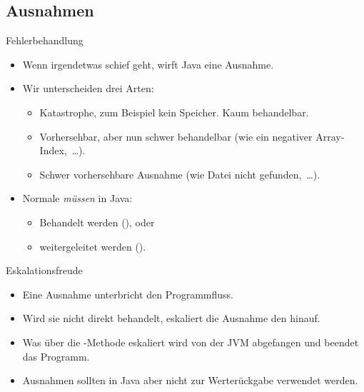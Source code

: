 {\subsection{Ausnahmen}
\begin{frame}{Fehlerbehandlung}
   \begin{itemize}[<+(1)->]
      \itemsep8pt
      \item Wenn irgendetwas schief geht, wirft Java eine Ausnahme.
      \item Wir unterscheiden drei Arten: \begin{itemize}
         \item {} Katastrophe, zum Beispiel kein Speicher. Kaum behandelbar.
         \item {} Vorhersehbar, aber nun schwer behandelbar (wie ein negativer Array-Index,~\ldots).
         \item {} Schwer vorhersehbare Ausnahme (wie Datei nicht gefunden,~\ldots).
      \end{itemize}
      \item Normale  \emph{müssen} in Java: \begin{itemize}
         \item Behandelt werden (), oder
         \item weitergeleitet werden ().
      \end{itemize}
   \end{itemize}
\end{frame}

\begin{frame}[c]{Eskalationsfreude}
   \begin{itemize}[<+(1)->]
      \itemsep10pt
      \item Eine Ausnahme unterbricht den Programmfluss.
      \item Wird sie nicht direkt behandelt, eskaliert die Ausnahme den  hinauf.
      \item Was über die -Methode eskaliert wird von der JVM abgefangen und beendet das Programm.
      \item Ausnahmen sollten in Java aber nicht zur Werterückgabe verwendet werden.
   \end{itemize}
\end{frame}


}
